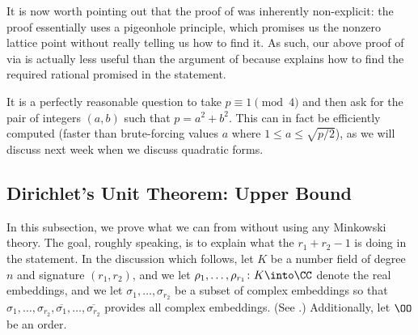 \documentclass[../notes.tex]{subfiles}
\begin{document}
It is now worth pointing out that the proof of  was inherently non-explicit: the proof essentially uses a pigeonhole principle, which promises us the nonzero lattice point without really telling us how to find it. As such, our above proof of  via  is actually less useful than the argument of  because  explains how to find the required rational promised in the statement.

It is a perfectly reasonable question to take $p\equiv1\pmod4$ and then ask for the pair of integers $(a,b)$ such that $p=a^2+b^2$. This can in fact be efficiently computed (faster than brute-forcing values $a$ where $1\le a\le\sqrt{p/2}$), as we will discuss next week when we discuss quadratic forms.

\subsection{Dirichlet's Unit Theorem: Upper Bound} \label{subsec:dirichlet-upper}
In this subsection, we prove what we can from  without using any Minkowski theory. The goal, roughly speaking, is to explain what the $r_1+r_2-1$ is doing in the statement. In the discussion which follows, let $K$ be a number field of degree $n$ and signature $(r_1,r_2)$, and we let $\rho_1,\ldots,\rho_{r_1}\colon K\into\CC$ denote the real embeddings, and we let $\sigma_1,\ldots,\sigma_{r_2}$ be a subset of complex embeddings so that $\sigma_1,\ldots,\sigma_{r_2},\overline{\sigma_1},\ldots,\overline{\sigma_{r_2}}$ provides all complex embeddings. (See .) Additionally, let $\OO$ be an order.
\end{document}
